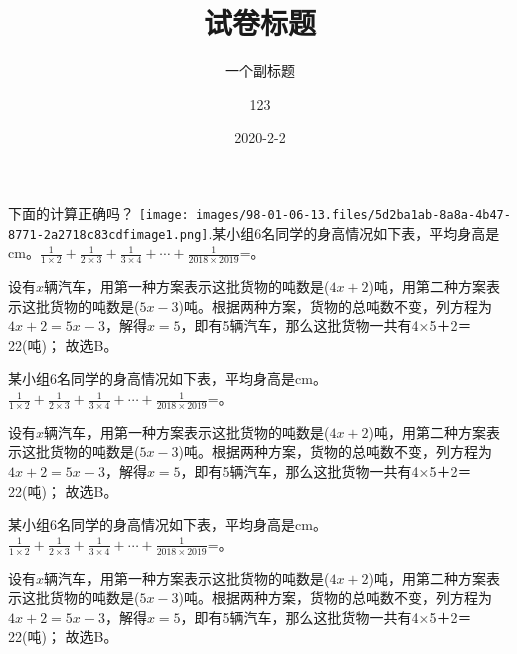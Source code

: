 \documentclass[answers]{BHCexam}
\begin{document}
\title{试卷标题}
\subtitle{一个副标题}
\author{123}
\date{2020-2-2}
\maketitle
\begin{groups}
\begin{questions}[p]
\question[] 下面的计算正确吗？ \quad\texttt{[image: images/98-01-06-13.files/5d2ba1ab-8a8a-4b47-8771-2a2718c83cdfimage1.png]}.某小组6名同学的身高情况如下表，平均身高是cm。\( \displaystyle \frac{1}{1\times 2}+\frac{1}{2\times 3}+\frac{1}{3\times 4}+\cdots +\frac{1}{2018\times 2019}\)=。 
\begin{solution}{4cm} 
\methodonly 设有\( x\)辆汽车，用第一种方案表示这批货物的吨数是(\( 4x+2\))吨，用第二种方案表示这批货物的吨数是(\( 5x-3\))吨。根据两种方案，货物的总吨数不变，列方程为\( 4x+2=5x-3\)，解得\( x=5\)，即有5辆汽车，那么这批货物一共有4×5＋2＝22(吨)； 故选B。 
\end{solution} 
\question[] 某小组6名同学的身高情况如下表，平均身高是cm。\( \displaystyle \frac{1}{1\times 2}+\frac{1}{2\times 3}+\frac{1}{3\times 4}+\cdots +\frac{1}{2018\times 2019}\)=。 
\begin{solution}{4cm} 
\methodonly 设有\( x\)辆汽车，用第一种方案表示这批货物的吨数是(\( 4x+2\))吨，用第二种方案表示这批货物的吨数是(\( 5x-3\))吨。根据两种方案，货物的总吨数不变，列方程为\( 4x+2=5x-3\)，解得\( x=5\)，即有5辆汽车，那么这批货物一共有4×5＋2＝22(吨)； 故选B。 
\end{solution} 
\question[] 某小组6名同学的身高情况如下表，平均身高是cm。\( \displaystyle \frac{1}{1\times 2}+\frac{1}{2\times 3}+\frac{1}{3\times 4}+\cdots +\frac{1}{2018\times 2019}\)=。 
\begin{solution}{4cm} 
\methodonly 设有\( x\)辆汽车，用第一种方案表示这批货物的吨数是(\( 4x+2\))吨，用第二种方案表示这批货物的吨数是(\( 5x-3\))吨。根据两种方案，货物的总吨数不变，列方程为\( 4x+2=5x-3\)，解得\( x=5\)，即有5辆汽车，那么这批货物一共有4×5＋2＝22(吨)； 故选B。 
\end{solution} 
 
\end{questions}


\end{groups}
\end{document}
